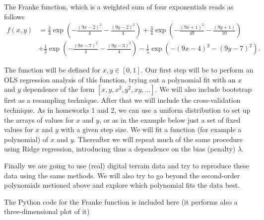 \documentclass[%
oneside,                 %
final,                   %
10pt]{article}
\begin{document}
The Franke function, which is a weighted sum of four exponentials  reads as follows
\begin{align*}
f(x,y) &= \frac{3}{4}\exp{\left(-\frac{(9x-2)^2}{4} - \frac{(9y-2)^2}{4}\right)}+\frac{3}{4}\exp{\left(-\frac{(9x+1)^2}{49}- \frac{(9y+1)}{10}\right)} \\
&+\frac{1}{2}\exp{\left(-\frac{(9x-7)^2}{4} - \frac{(9y-3)^2}{4}\right)} -\frac{1}{5}\exp{\left(-(9x-4)^2 - (9y-7)^2\right) }.
\end{align*}

The function will be defined for $x,y\in [0,1]$.  Our first step will
be to perform an OLS regression analysis of this function, trying out
a polynomial fit with an $x$ and $y$ dependence of the form $[x, y,
x^2, y^2, xy, \dots]$. We will also include bootstrap first as
a resampling technique.  After that we will include the cross-validation technique. As in homeworks 1 and 2, we can use a uniform
distribution to set up the arrays of values for $x$ and $y$, or as in
the example below just a set of fixed 
values for $x$ and $y$ with a given step
size.  We will fit a
function (for example a polynomial) of $x$ and $y$.  Thereafter we
will repeat much of the same procedure using Ridge 
regression, introducing thus a dependence on the bias
(penalty) $\lambda$.

Finally we are going to use (real) digital terrain data and try to
reproduce these data using the same methods. We will also try to go
beyond the second-order polynomials metioned above and explore 
which polynomial fits the data best.

The Python code for the Franke function is included here (it performs also a three-dimensional plot of it)
\end{document}
